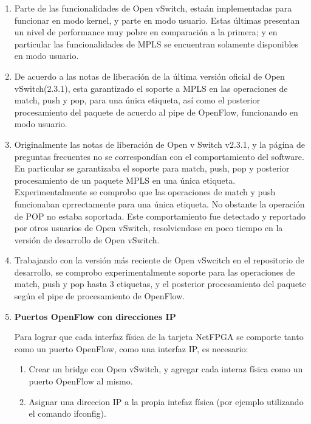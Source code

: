 \begin{enumerate}
\item Parte de las funcionalidades de Open vSwitch, esta\'an implementadas para funcionar en modo kernel, y parte en modo usuario. Estas \'ultimas presentan un nivel de performance muy pobre en comparaci\'on a la primera; y en particular las funcionalidades de MPLS se encuentran solamente disponibles en modo usuario.

\item De acuerdo a las notas de liberaci\'on de la \'ultima versi\'on oficial de Open vSwitch(2.3.1), 
esta garantizado el soporte a MPLS en las operaciones de match, push y pop, para una \'unica etiqueta, as\'i como el posterior procesamiento del paquete de acuerdo al pipe de OpenFlow, funcionando en modo usuario.

\item Originalmente las notas de liberaci\'on de Open v Switch v2.3.1, y la p\'agina de preguntas frecuentes no se correspond\'ian con el comportamiento del software. En particular se garantizaba el soporte para match, push, pop y posterior procesamiento de un paquete MPLS en una \'unica etiqueta.
Experimentalmente se comprobo que las operaciones de match y push funcionaban cprrectamente para una \'unica etiqueta. No obstante la operaci\'on de POP no estaba soportada. Este comportamiento fue detectado y reportado por otros usuarios de Open vSwitch, resolviendose en poco tiempo en la versi\'on de desarrollo de Open vSwitch.

\item Trabajando con la versi\'on m\'as reciente de Open vSwcitch en el repositorio de desarrollo, se comprobo experimentalmente soporte para las operaciones de match, push y pop hasta 3 etiquetas, y el posterior procesamiento del paquete seg\'un el pipe de procesamiento de OpenFlow.

\item \textbf{Puertos OpenFlow con direcciones IP}
 
Para lograr que cada interfaz f\'isica de la tarjeta NetFPGA se comporte tanto como un puerto OpenFlow, como una interfaz IP, es necesario:

\begin{enumerate}
\item Crear un bridge con Open vSwitch, y agregar cada interaz f\'isica como un puerto OpenFlow al mismo.
\item Asignar una direccion IP a la propia intefaz f\'isica (por ejemplo utilizando el comando ifconfig).
\end{enumerate}


\end{enumerate}
